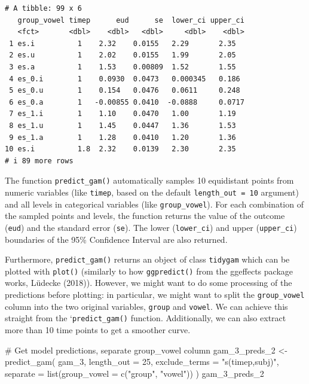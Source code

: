 \documentclass[
  letterpaper,
  DIV=11,
  numbers=noendperiod]{scrartcl}
\newenvironment{Shaded}{\begin{snugshade}}{\end{snugshade}}
\newcommand{\AttributeTok}[1]{\textcolor[rgb]{0.40,0.45,0.13}{#1}}
\newcommand{\CommentTok}[1]{\textcolor[rgb]{0.37,0.37,0.37}{#1}}
\newcommand{\DecValTok}[1]{\textcolor[rgb]{0.68,0.00,0.00}{#1}}
\newcommand{\FunctionTok}[1]{\textcolor[rgb]{0.28,0.35,0.67}{#1}}
\newcommand{\NormalTok}[1]{\textcolor[rgb]{0.00,0.23,0.31}{#1}}
\newcommand{\OtherTok}[1]{\textcolor[rgb]{0.00,0.23,0.31}{#1}}
\newcommand{\StringTok}[1]{\textcolor[rgb]{0.13,0.47,0.30}{#1}}
\begin{document}
\begin{verbatim}
# A tibble: 99 x 6
   group_vowel timep      eud      se  lower_ci upper_ci
   <fct>       <dbl>    <dbl>   <dbl>     <dbl>    <dbl>
 1 es.i          1    2.32    0.0155   2.29       2.35  
 2 es.u          1    2.02    0.0155   1.99       2.05  
 3 es.a          1    1.53    0.00809  1.52       1.55  
 4 es_0.i        1    0.0930  0.0473   0.000345   0.186 
 5 es_0.u        1    0.154   0.0476   0.0611     0.248 
 6 es_0.a        1   -0.00855 0.0410  -0.0888     0.0717
 7 es_1.i        1    1.10    0.0470   1.00       1.19  
 8 es_1.u        1    1.45    0.0447   1.36       1.53  
 9 es_1.a        1    1.28    0.0410   1.20       1.36  
10 es.i          1.8  2.32    0.0139   2.30       2.35  
# i 89 more rows
\end{verbatim}

The function \texttt{predict\_gam()} automatically samples 10
equidistant points from numeric variables (like \texttt{timep}, based on
the default \texttt{length\_out\ =\ 10} argument) and all levels in
categorical variables (like \texttt{group\_vowel}). For each combination
of the sampled points and levels, the function returns the value of the
outcome (\texttt{eud}) and the standard error (\texttt{se}). The lower
(\texttt{lower\_ci}) and upper (\texttt{upper\_ci}) boundaries of the
95\% Confidence Interval are also returned.

Furthermore, \texttt{predict\_gam()} returns an object of class
\texttt{tidygam} which can be plotted with \texttt{plot()} (similarly to
how \texttt{ggpredict()} from the ggeffects package works, Lüdecke
(2018)). However, we might want to do some processing of the predictions
before plotting: in particular, we might want to split the
\texttt{group\_vowel} column into the two original variables,
\texttt{group} and \texttt{vowel}. We can achieve this straight from the
`\texttt{predict\_gam()\textasciigrave{}} function. Additionally, we can
also extract more than 10 time points to get a smoother curve.

\begin{Shaded}
\begin{Highlighting}[]
\CommentTok{\# Get model predictions, separate group\_vowel column}
\NormalTok{gam\_3\_preds\_2 }\OtherTok{\textless{}{-}} \FunctionTok{predict\_gam}\NormalTok{(}
\NormalTok{  gam\_3,}
  \AttributeTok{length\_out =} \DecValTok{25}\NormalTok{,}
  \AttributeTok{exclude\_terms =} \StringTok{"s(timep,subj)"}\NormalTok{,}
  \AttributeTok{separate =} \FunctionTok{list}\NormalTok{(}\AttributeTok{group\_vowel =} \FunctionTok{c}\NormalTok{(}\StringTok{"group"}\NormalTok{, }\StringTok{"vowel"}\NormalTok{))}
\NormalTok{)}
\NormalTok{gam\_3\_preds\_2}
\end{Highlighting}
\end{Shaded}
\end{document}
